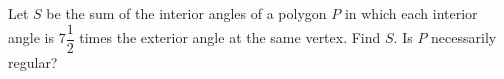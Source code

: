 Let $S$ be the sum of the interior angles of a polygon $P$ in which each interior angle is $7\dfrac{1}{2}$ times the exterior angle at the same vertex. Find $S$. Is $P$ necessarily regular?
